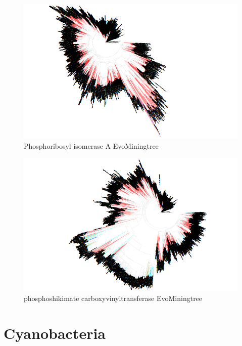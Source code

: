 \documentclass[12pt,twoside]{reedthesis}
\begin{document}
\begin{figure}[h!tbp]
  \end{figure}\begin{figure}[h!tbp]
  \centering
  \includegraphics[angle = 180,scale = 0.3]{chapter2/Actinobacteria/tree47.png}
  \caption[Phosphoribosyl isomerase A EvoMiningtree]{\normalsize{Phosphoribosyl isomerase A EvoMiningtree}}
  \label{fig:Phosphoribosyl_isomerase_A_evo_tree}
  \end{figure}\begin{figure}[h!tbp]
  \centering
  \includegraphics[angle = 180,scale = 0.3]{chapter2/Actinobacteria/tree69.png}
  \caption[phosphoshikimate carboxyvinyltransferase EvoMiningtree]{\normalsize{phosphoshikimate carboxyvinyltransferase EvoMiningtree}}
  \label{fig:phosphoshikimate_c_evo_tree}
  \end{figure}
  
  \clearpage 
  
  \section{Cyanobacteria}\label{cyanobacteria}
  
\end{document}
